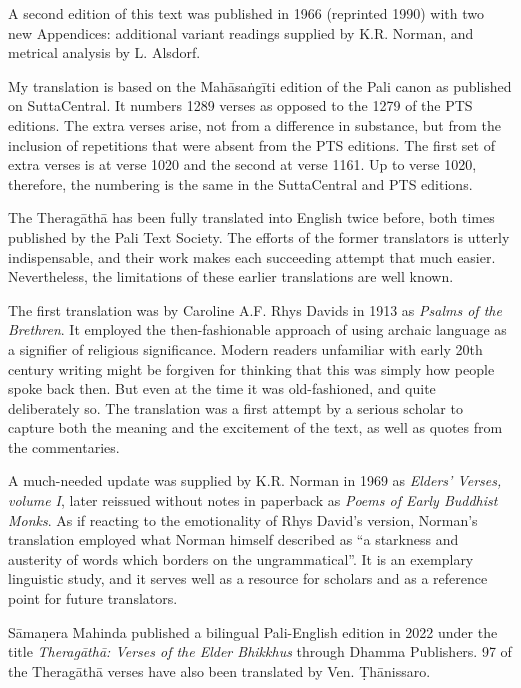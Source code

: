 \documentclass[12pt,openany]{book}%
\begin{document}
A second edition of this text was published in 1966 (reprinted 1990) with two new Appendices: additional variant readings supplied by K.R. Norman, and metrical analysis by L. Alsdorf.

My translation is based on the \textsanskrit{Mahāsaṅgīti} edition of the Pali canon as published on SuttaCentral. It numbers 1289 verses as opposed to the 1279 of the PTS editions. The extra verses arise, not from a difference in substance, but from the inclusion of repetitions that were absent from the PTS editions. The first set of extra verses is at verse 1020 and the second at verse 1161. Up to verse 1020, therefore, the numbering is the same in the SuttaCentral and PTS editions.

The \textsanskrit{Theragāthā} has been fully translated into English twice before, both times published by the Pali Text Society. The efforts of the former translators is utterly indispensable, and their work makes each succeeding attempt that much easier. Nevertheless, the limitations of these earlier translations are well known.

The first translation was by Caroline A.F. Rhys Davids in 1913 as \textit{Psalms of the Brethren}. It employed the then-fashionable approach of using archaic language as a signifier of religious significance. Modern readers unfamiliar with early 20th century writing might be forgiven for thinking that this was simply how people spoke back then. But even at the time it was old-fashioned, and quite deliberately so. The translation was a first attempt by a serious scholar to capture both the meaning and the excitement of the text, as well as quotes from the commentaries.

A much-needed update was supplied by K.R. Norman in 1969 as \textit{Elders’ Verses, volume I}, later reissued without notes in paperback as \textit{Poems of Early Buddhist Monks}. As if reacting to the emotionality of Rhys David’s version, Norman’s translation employed what Norman himself described as “a starkness and austerity of words which borders on the ungrammatical”. It is an exemplary linguistic study, and it serves well as a resource for scholars and as a reference point for future translators.

\textsanskrit{Sāmaṇera} Mahinda published a bilingual Pali-English edition in 2022 under the title \textit{\textsanskrit{Theragāthā}: Verses of the Elder Bhikkhus} through Dhamma Publishers. 97 of the \textsanskrit{Theragāthā} verses have also been translated by Ven. \textsanskrit{Ṭhānissaro}.
\end{document}
